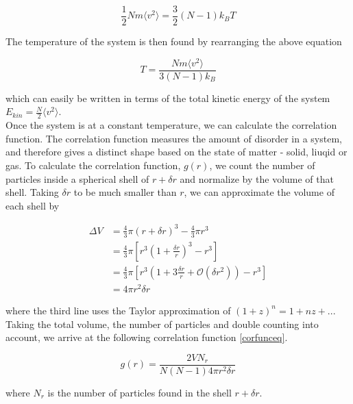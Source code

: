 \documentclass{article}
\begin{document}
\begin{multicols}{2}
\begin{equation}
\frac{1}{2}N m \langle v^2 \rangle = \frac{3}{2} (N-1) k_B T
\end{equation}

\noindent The temperature of the system is then found by rearranging the above equation

\begin{equation}
T = \frac{Nm \langle v^2 \rangle}{3(N-1)k_B}
\end{equation}

\noindent which can easily be written in terms of the total kinetic energy of the system $E_{kin} = \frac{N}{2} \langle v^2 \rangle $.  \\

Once the system is at a constant temperature, we can calculate the correlation function.  The correlation function measures the amount of disorder in a system, and therefore gives a distinct shape based on the state of matter - solid, liuqid or gas.  To calculate the correlation function, $g(r)$, we count the number of particles inside a spherical shell of $r + \delta r$ and normalize by the volume of that shell.  Taking $\delta r$ to be much smaller than $r$, we can approximate the volume of each shell by

\begin{equation}
\begin{split}
\Delta V & = \frac{4}{3} \pi (r+\delta r)^3 - \frac{4}{3} \pi r^3 \\
& = \frac{4}{3} \pi \left [ r^3 \left (1+\frac{\delta r}{r} \right )^3 - r^3 \right ] \\
& = \frac{4}{3} \pi \left [ r^3 \left ( 1 + 3\frac{\delta r}{r} + \mathcal{O} (\delta r ^2) \right ) - r^3 \right ] \\
& = 4 \pi r^2 \delta r
\end{split}
\end{equation}

\noindent where the third line uses the Taylor approximation of $(1+z)^n = 1 + nz+ ...$  Taking the total volume, the number of particles and double counting into account, we arrive at the following correlation function \ref{corfunceq}. 

\begin{equation}
g(r) = \frac{2VN_r}{N(N-1)4 \pi r^2 \delta r}
\label{corfunceq}
\end{equation}

\noindent where $N_r$ is the number of particles found in the shell $r + \delta r$.  \\


\end{multicols}
\end{document}
